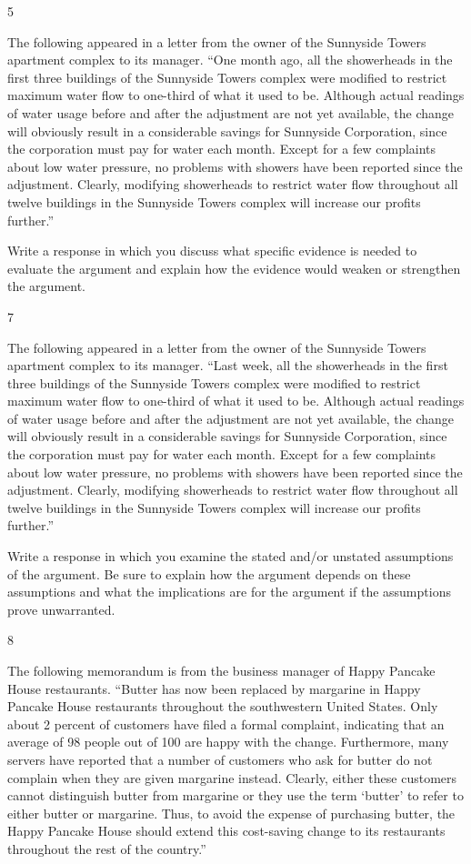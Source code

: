\documentclass[]{article}
\begin{document}
5

The following appeared in a letter from the owner of the Sunnyside
Towers apartment complex to its manager. ``One month ago, all the
showerheads in the first three buildings of the Sunnyside Towers complex
were modified to restrict maximum water flow to one-third of what it
used to be. Although actual readings of water usage before and after the
adjustment are not yet available, the change will obviously result in a
considerable savings for Sunnyside Corporation, since the corporation
must pay for water each month. Except for a few complaints about low
water pressure, no problems with showers have been reported since the
adjustment. Clearly, modifying showerheads to restrict water flow
throughout all twelve buildings in the Sunnyside Towers complex will
increase our profits further.''

Write a response in which you discuss what specific evidence is needed
to evaluate the argument and explain how the evidence would weaken or
strengthen the argument.

7

The following appeared in a letter from the owner of the Sunnyside
Towers apartment complex to its manager. ``Last week, all the
showerheads in the first three buildings of the Sunnyside Towers complex
were modified to restrict maximum water flow to one-third of what it
used to be. Although actual readings of water usage before and after the
adjustment are not yet available, the change will obviously result in a
considerable savings for Sunnyside Corporation, since the corporation
must pay for water each month. Except for a few complaints about low
water pressure, no problems with showers have been reported since the
adjustment. Clearly, modifying showerheads to restrict water flow
throughout all twelve buildings in the Sunnyside Towers complex will
increase our profits further.''

Write a response in which you examine the stated and/or unstated
assumptions of the argument. Be sure to explain how the argument depends
on these assumptions and what the implications are for the argument if
the assumptions prove unwarranted.

8

The following memorandum is from the business manager of Happy Pancake
House restaurants. ``Butter has now been replaced by margarine in Happy
Pancake House restaurants throughout the southwestern United States.
Only about 2 percent of customers have filed a formal complaint,
indicating that an average of 98 people out of 100 are happy with the
change. Furthermore, many servers have reported that a number of
customers who ask for butter do not complain when they are given
margarine instead. Clearly, either these customers cannot distinguish
butter from margarine or they use the term `butter' to refer to either
butter or margarine. Thus, to avoid the expense of purchasing butter,
the Happy Pancake House should extend this cost-saving change to its
restaurants throughout the rest of the country.''
\end{document}
